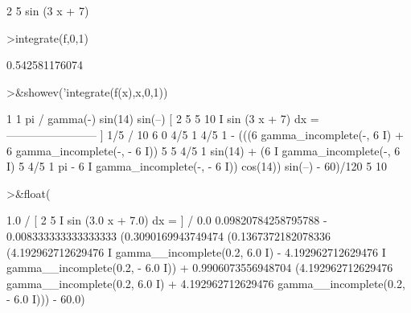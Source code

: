 \documentclass[a4paper,10pt]{article}
\begin{document}
\begin{eulernotebook}
\begin{eulercomment}
\begin{eulercomment}
\begin{eulercomment}
\begin{eulercomment}
\begin{eulercomment}
\begin{eulercomment}
\begin{eulercomment}
\begin{eulercomment}
\begin{eulercomment}
\begin{eulercomment}
\begin{eulercomment}
\begin{eulercomment}
\begin{eulercomment}
\begin{eulercomment}
\begin{eulercomment}
\begin{eulercomment}
\begin{euleroutput}
                                 2    5
                              sin (3 x  + 7)
  
\end{euleroutput}
\begin{eulerprompt}
>integrate(f,0,1)
\end{eulerprompt}
\begin{euleroutput}
  0.542581176074
\end{euleroutput}
\begin{eulerprompt}
>&showev('integrate(f(x),x,0,1))
\end{eulerprompt}
\begin{euleroutput}
  
           1                           1              pi
          /                      gamma(-) sin(14) sin(--)
          [     2    5                 5              10
          I  sin (3 x  + 7) dx = ------------------------
          ]                                  1/5
          /                              10 6
           0
         4/5                  1          4/5                  1
   - (((6    gamma_incomplete(-, 6 I) + 6    gamma_incomplete(-, - 6 I))
                              5                               5
               4/5                    1
   sin(14) + (6    I gamma_incomplete(-, 6 I)
                                      5
      4/5                    1                       pi
   - 6    I gamma_incomplete(-, - 6 I)) cos(14)) sin(--) - 60)/120
                             5                       10
  
\end{euleroutput}
\begin{eulerprompt}
>&float(%
\end{eulerprompt}
\begin{euleroutput}
  
           1.0
          /
          [       2      5
          I    sin (3.0 x  + 7.0) dx = 
          ]
          /
           0.0
  0.09820784258795788 - 0.008333333333333333
   (0.3090169943749474 (0.1367372182078336
   (4.192962712629476 I gamma__incomplete(0.2, 6.0 I)
   - 4.192962712629476 I gamma__incomplete(0.2, - 6.0 I))
   + 0.9906073556948704 (4.192962712629476 gamma__incomplete(0.2, 6.0 I)
   + 4.192962712629476 gamma__incomplete(0.2, - 6.0 I))) - 60.0)
  

\end{euleroutput}
\end{eulercomment}
\end{eulercomment}
\end{eulercomment}
\end{eulercomment}
\end{eulercomment}
\end{eulercomment}
\end{eulercomment}
\end{eulercomment}
\end{eulercomment}
\end{eulercomment}
\end{eulercomment}
\end{eulercomment}
\end{eulercomment}
\end{eulercomment}
\end{eulercomment}
\end{eulercomment}
\end{eulernotebook}
\end{document}
